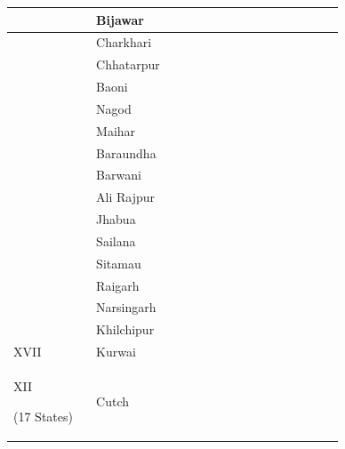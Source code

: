 \begin{longtable}{|p{0.23\linewidth}|p{0.23\linewidth}|p{0.23\linewidth}|p{0.23\linewidth}|}
 \\
\hline
 & Bijawar

 \\
\hline
 & Charkhari

 \\
\hline
 & Chhatarpur

 \\
\hline
 & Baoni

 \\
\hline
 & Nagod

 \\
\hline
 & Maihar

 \\
\hline
 & Baraundha

 \\
\hline
 & Barwani

 \\
\hline
 & Ali Rajpur

 \\
\hline
 & Jhabua

 \\
\hline
 & Sailana

 \\
\hline
 & Sitamau

 \\
\hline
 & Raigarh

 \\
\hline
 & Narsingarh 

 \\
\hline
 & Khilchipur

 \\
\hline
XVII

 & Kurwai

 \\
\hline
\multirow{17}{*}{XII











(17 States)





















} & Cutch

 & \multirow{17}{*}{











}
\end{longtable}
